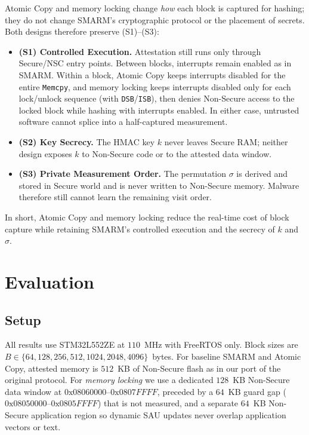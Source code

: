 \documentclass[conference]{IEEEtran}
\begin{document}
Atomic Copy and memory locking change \emph{how} each block is captured
for hashing; they do not change SMARM's cryptographic protocol or the
placement of secrets. Both designs therefore preserve
(S1)--(S3):
\begin{itemize}
  \item \textbf{(S1) Controlled Execution.}
    Attestation still runs only through Secure/NSC entry points.
    Between blocks, interrupts remain enabled as in SMARM.
    Within a block, Atomic Copy keeps interrupts disabled for the
    entire \texttt{Memcpy}, and memory locking keeps interrupts disabled
    only for each lock/unlock sequence (with \texttt{DSB}/\texttt{ISB}),
    then denies Non-Secure access to the locked block while hashing with
    interrupts enabled. In either case, untrusted software cannot splice
    into a half-captured measurement.
  \item \textbf{(S2) Key Secrecy.}
    The HMAC key $k$ never leaves Secure RAM; neither design exposes
    $k$ to Non-Secure code or to the attested data window.
  \item \textbf{(S3) Private Measurement Order.}
    The permutation $\sigma$ is derived and stored in Secure world and
    is never written to Non-Secure memory. Malware therefore still
    cannot learn the remaining visit order.
\end{itemize}
In short, Atomic Copy and memory locking reduce the real-time cost of
block capture while retaining SMARM's controlled execution and the
secrecy of $k$ and $\sigma$.

\FloatBarrier
\section{Evaluation}
\label{sec:eval}

\subsection{Setup}
\label{sec:eval-setup}

All results use STM32L552ZE at $110$~MHz with FreeRTOS only.
Block sizes are $B\in\{64,128,256,512,1024,2048,4096\}$~bytes.
For baseline SMARM and Atomic Copy, attested memory is $512$~KB of
Non-Secure flash as in our port of the original protocol.
For \emph{memory locking} we use a dedicated $128$~KB Non-Secure data
window at $0\mathrm{x}08060000$--$0\mathrm{x}0807FFFF$, preceded by a
$64$~KB guard gap ($0\mathrm{x}08050000$--$0\mathrm{x}0805FFFF$) that
is not measured, and a separate $64$~KB Non-Secure application region
so dynamic SAU updates never overlap application vectors or text.
\end{document}
